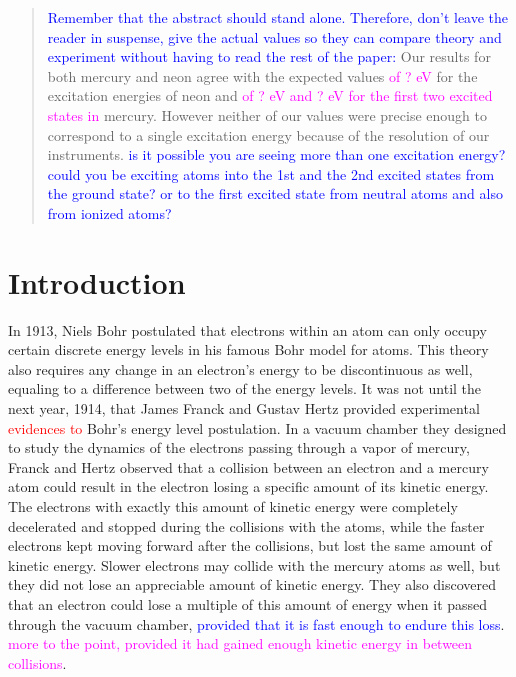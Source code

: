 \documentclass[prb,preprint]{revtex4-1}
\begin{document}
\begin{abstract}
\textcolor{blue}{Remember that the abstract should stand alone. Therefore, don't leave the reader in suspense, give the actual values so they can compare theory and experiment without having to read the rest of the paper: } Our results for both mercury and neon agree with the expected values \textcolor{magenta}{of ? eV} for the excitation energies of neon and \textcolor{magenta}{of ? eV and ? eV for the first two excited states in } mercury. However neither of our values were precise enough to correspond to a single excitation energy because of the resolution of our instruments. \textcolor{blue}{is it possible you are seeing more than one excitation energy? could you be exciting atoms into the 1st and the 2nd excited states from the ground state? or to the first excited state from neutral atoms and also from ionized atoms?}

\end{abstract}


\maketitle 

\section{Introduction}
\label{introduction}

In 1913, Niels Bohr postulated that electrons within an atom can only occupy certain discrete energy levels in his famous Bohr model for atoms. This theory also requires any change in an electron's energy to be discontinuous as well, equaling to a difference between two of the energy levels. It was not until the next year, 1914, that James Franck and Gustav Hertz provided experimental \textcolor{red}{evidences to} Bohr's energy level postulation. In a vacuum chamber they designed to study the dynamics of the electrons passing through a vapor of mercury, Franck and Hertz observed that a collision between an electron and a mercury atom could result in the electron losing a specific amount of its kinetic energy. The electrons with exactly this amount of kinetic energy were completely decelerated and stopped during the collisions with the atoms, while the faster electrons kept moving forward after the collisions, but lost the same amount of kinetic energy. Slower electrons may collide with the mercury atoms as well, but they did not lose an appreciable amount of kinetic energy.  They also discovered that an electron could lose a multiple of this amount of energy when it passed through the vacuum chamber, \textcolor{blue}{provided that it is fast enough to endure this loss}. \textcolor{magenta}{more to the point, provided it had gained enough kinetic energy in between collisions}. 
\end{document}
